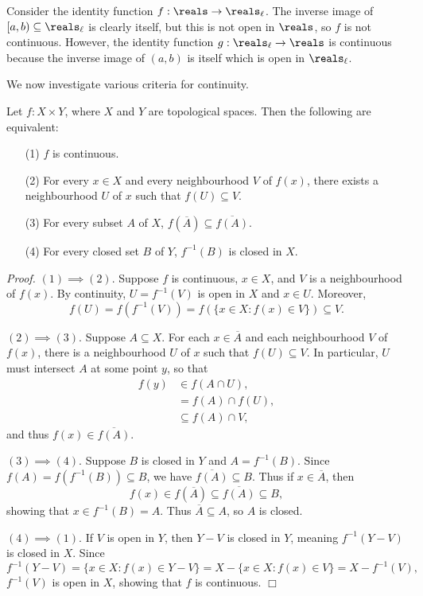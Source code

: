 Consider the identity function $f: \reals \rightarrow \reals_\ell$. The inverse image of $[a, b) \subseteq \reals_\ell$ is clearly itself, but this is not open in $\reals$, so $f$ is not continuous. However, the identity function $g: \reals_\ell \rightarrow \reals$ is continuous because the inverse image of $(a,b)$ is itself which is open in $\reals_\ell$.

We now investigate various criteria for continuity.
\begin{theorem}\label{2.35}
    Let $f:X \times Y$, where $X$ and $Y$ are topological spaces. Then the following are equivalent:
    \begin{enumerate}
        \item[(1)] $f$ is continuous.
        \item[(2)] For every $x \in X$ and every neighbourhood $V$ of $f(x)$, there exists a neighbourhood $U$ of $x$ such that $f(U) \subseteq V$.
        \item[(3)] For every subset $A$ of $X$, $f(\overline{A}) \subseteq \overline{f(A)}$.
        \item[(4)] For every closed set $B$ of $Y$, $f^{-1}(B)$ is closed in $X$.
    \end{enumerate}
\end{theorem}
{\it Proof.} $(1) \implies (2)$. Suppose $f$ is continuous, $x \in X$, and $V$ is a neighbourhood of $f(x)$. By continuity, $U = f^{-1}(V)$ is open in $X$ and $x \in U$. Moreover, 
$$f(U) = f(f^{-1}(V)) = f(\{x \in X: f(x) \in V\}) \subseteq V.$$

$(2) \implies (3)$. Suppose $A \subseteq X$. For each $x \in \overline{A}$ and each neighbourhood $V$ of $f(x)$, there is a neighbourhood $U$ of $x$ such that $f(U) \subseteq V$. In particular, $U$ must intersect $A$ at some point $y$, so that
\begin{align*}
    f(y) &\in f(A \cap U), \\
    &= f(A) \cap f(U), \\
    &\subseteq f(A) \cap V,
\end{align*}
and thus $f(x) \in \overline{f(A)}$.

$(3) \implies (4)$. Suppose $B$ is closed in $Y$ and $A = f^{-1}(B)$. Since $f(A) = f(f^{-1}(B)) \subseteq B$, we have $\overline{f(A)} \subseteq B$. Thus if $x \in \overline{A}$, then
$$f(x) \in f(\overline{A}) \subseteq \overline{f(A)} \subseteq B,$$
showing that $x \in f^{-1}(B) = A$. Thus $\overline{A} \subseteq A$, so $A$ is closed.

$(4) \implies (1)$. If $V$ is open in $Y$, then $Y-V$ is closed in $Y$, meaning $f^{-1}(Y-V)$ is closed in $X$. Since
$$f^{-1}(Y-V) = \{x \in X: f(x) \in Y-V\} = X - \{x \in X:f(x) \in V\} = X - f^{-1}(V),$$
$f^{-1}(V)$ is open in $X$, showing that $f$ is continuous. $\Box$

